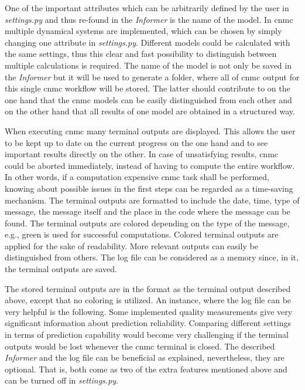 One of the important attributes which 
can be arbitrarily defined by the user in \emph{settings.py} and thus re-found in the \emph{Informer} is the name of the model. 
In \gls{cnmc} multiple dynamical systems are implemented, which can be chosen by simply changing one attribute in \emph{settings.py}. 
Different models could be calculated with the same settings, thus this clear and fast possibility to distinguish between multiple calculations is required. 
The name of the model is not only be saved in the \emph{Informer} but it will 
be used to generate a folder, where all of \gls{cnmc} output for this single 
\gls{cnmc} workflow will be stored. 
The latter should contribute to on the one hand that the \gls{cnmc} models can be easily distinguished from each other and on the other hand that all results of one model are obtained in a structured way.
\newline 

When executing \gls{cnmc} many terminal outputs are displayed. This allows the user to be kept up to date on the current progress on the one hand and to see important results directly on the other. 
In case of unsatisfying results, \gls{cnmc} could be aborted immediately, instead of having to compute the entire workflow. In other words, if a computation expensive \gls{cnmc} task shall be performed, knowing about possible issues in the first steps can 
be regarded as a time-saving mechanism. 
The terminal outputs are formatted to include the date, time, type of message, the message itself and the place in the code where the message can be found. 
The terminal outputs are colored depending on the type of the message, e.g., green is used for successful computations. 
Colored terminal outputs are applied for the sake of readability. 
More relevant outputs can easily be distinguished from others. 
The log file can be considered as a memory since, in it, the terminal outputs are saved.\newline

The stored terminal outputs are in the format as the terminal output described above, except that no coloring is utilized.
An instance, where the log file can be very helpful is the following. Some implemented quality measurements give very significant information about prediction reliability. Comparing different settings in terms of prediction capability would become very challenging if the terminal outputs would be lost whenever the \gls{cnmc} terminal is closed. The described \emph{Informer} and the log file can be beneficial as explained, nevertheless, they are optional.
That is, both come as two of the extra features mentioned above and can be turned off in \emph{settings.py}.\newline 

